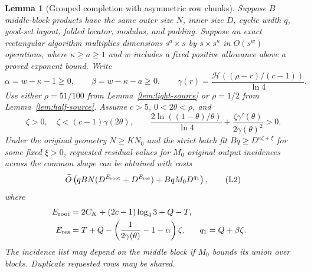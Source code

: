 \documentclass[11pt]{article}
\newtheorem{lemma}[theorem]{Lemma}
\newcommand{\softO}{\widetilde O}
\newcommand{\HH}{\mathcal H}
\begin{document}
\begin{lemma}[Grouped completion with asymmetric row chunks]
\label{lem:light-completion}
Suppose $B$ middle-block products have the same outer size $N$, inner
size $D$, cyclic width $q$, good-set layout, folded locator, modulus,
and padding. Suppose an exact rectangular algorithm
multiplies dimensions $s^a\times s$ by $s\times s^\kappa$ in
$O(s^w)$ operations, where $\kappa\ge a\ge1$ and $w$ includes a fixed
positive allowance above a proved exponent bound. Write
\[
 \alpha=w-\kappa-1\ge0,\qquad \beta=w-\kappa-a\ge0,\qquad
 \gamma(r)=\frac{\HH((\rho-r)/(c-1))}{\ln4}.
\]
Use either $\rho=51/100$ from Lemma~\ref{lem:light-source} or
$\rho=1/2$ from Lemma~\ref{lem:half-source}.
Assume $c>5$, $0<2\theta<\rho$, and
\[
 \zeta>0,\quad \zeta<(c-1)\gamma(2\theta),\qquad
 \frac{2\ln((1-\theta)/\theta)}{\ln4}
       +\frac{\zeta\gamma'(\theta)}{2\gamma(\theta)^2}>0.
                                                               \tag{L1}
\]
Under the original geometry $N\ge KN_0$ and the strict batch fit
$Bq\ge D^{\kappa\zeta+\xi}$ for some fixed $\xi>0$, requested residual
values for $M_0$ original output incidences across the common shape can
be obtained with costs
\[
 \softO\left(qBN(D^{E_{\rm root}}+D^{E_{\rm res}})
                    +BqM_0D^{q_1}\right),                    \tag{L2}
\]
where
\[
\begin{aligned}
 E_{\rm root}&=2C_K+(2c-1)\log_4 3+Q-T,\\
 E_{\rm res}&=T+Q-\left(\frac1{2\gamma(\theta)}-1-\alpha\right)\zeta,
 &q_1&=Q+\beta\zeta .
\end{aligned}
\]
The incidence list may depend on the middle block if $M_0$ bounds
its union over blocks. Duplicate requested rows may be shared.
\end{lemma}
\end{document}
